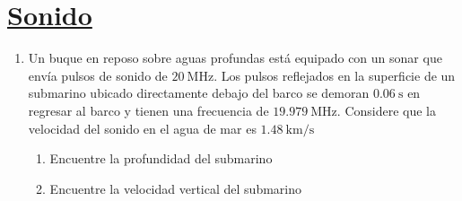 \documentclass[letterpaper,11pt]{article}
\begin{document}
\section*{\underline{Sonido}}

\begin{enumerate}\setlength{\itemsep}{0.4cm}

\item Un buque en reposo sobre aguas profundas está equipado con un sonar que envía pulsos de sonido de $\SI{20}{\MHz}$. Los pulsos reflejados en la superficie de un submarino ubicado directamente debajo del barco se demoran $\SI{0.06}{\s}$ en regresar al barco y tienen una frecuencia de $\SI{19.979}{\MHz}$. Considere que la velocidad del sonido en el agua de mar es $\SI{1.48}{\km/\s}$

\begin{enumerate}
    \item Encuentre la profundidad del submarino

    \item Encuentre la velocidad vertical del submarino
\end{enumerate}
\end{enumerate}
\end{document}
